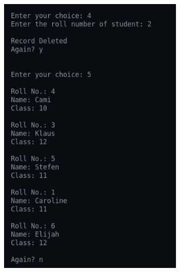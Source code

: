 \documentclass[12pt]{article}
\begin{document}
\newpage
\begin{figure}[h]
    \centering
    \includegraphics[width=0.8\textwidth]{13c.png}
\end{figure}
\end{document}

